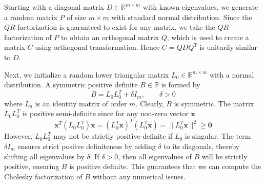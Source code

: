 Starting with a diagonal matrix $D \in \mathbb{R}^{m \times m}$ with known eigenvalues, we generate a random matrix $P$ of size $m \times m $ with standard normal distribution. Since the $QR$ factorization is guaranteed to exist for any matrix, we take the $QR$ factorization of $P$ to obtain an orthogonal matrix $Q$, which is used to create a matrix $C$ using orthogonal transformation. Hence $C = QDQ^T$ is unitarily similar to $D$.

Next, we initialize a random lower triangular matrix $L_0 \in \mathbb{R}^{m \times m}$ with a normal distribution. A symmetric positive definite $B \in \mathbb{R}$ is formed by
\begin{equation}
	B = L_0 L_0^T + \delta I_m, \qquad \delta > 0
\end{equation}
where $I_m$ is an identity matrix of order $m$. Clearly, $B$ is symmetric. The matrix $L_0L_0^T$ is positive semi-definite since for any non-zero vector $\mathbf{x}$
\begin{equation}
	\mathbf{x}^T(L_0L_0^T)\mathbf{x} = (L_0^T\mathbf{x})^T(L_0^T\mathbf{x}) = \| L_0^T\mathbf{x} \|^2 \geq \mathbf{0}
\end{equation}
However, $L_0L_0^T$ may not be strictly positive definite if $L_0$ is singular. The term $\delta I_m$ ensures strict positve definiteness by adding $\delta$ to its diagonals, thereby shifting all eigenvalues by $\delta$. If $\delta > 0$, then all eigenvalues of $B$ will be strictly positive, ensuring $B$ is positive definite. This guarantees that we can compute the Cholesky factorization of $B$ without any numerical issues.

